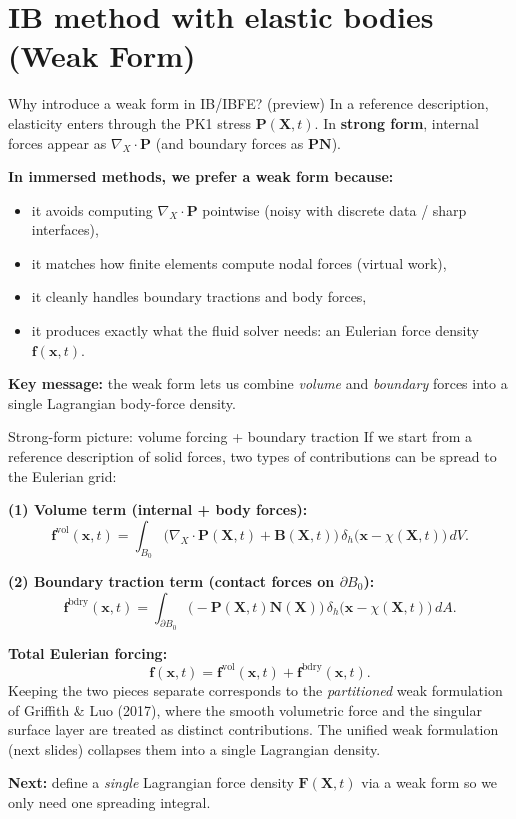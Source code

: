 \documentclass[aspectratio=169]{beamer}
\newcommand{\x}{\bm{x}}
\newcommand{\X}{\bm{X}}
\newcommand{\divX}{\nabla_{\!X}\!\cdot}
\newcommand{\Pten}{\bm{P}}        %
\newcommand{\Nvec}{\bm{N}}       %
\newcommand{\FLag}{\bm{F}}       %
\newcommand{\fEuler}{\bm{f}}     %
\newcommand{\deltah}{\delta_h}   %
\begin{document}
\section{IB method with elastic bodies (Weak Form)}
\begin{frame}{Why introduce a weak form in IB/IBFE? (preview)}
\small
In a reference description, elasticity enters through the PK1 stress \(\Pten(\X,t)\).
In \textbf{strong form}, internal forces appear as \(\divX \Pten\) (and boundary forces as \(\Pten\Nvec\)).

\medskip
\textbf{In immersed methods, we prefer a weak form because:}
\begin{itemize}
\item it avoids computing \(\divX\Pten\) pointwise (noisy with discrete data / sharp interfaces),
\item it matches how finite elements compute nodal forces (virtual work),
\item it cleanly handles boundary tractions and body forces,
\item it produces exactly what the fluid solver needs: an Eulerian force density \(\fEuler(\x,t)\).
\end{itemize}

\medskip
\textbf{Key message:} the weak form lets us combine \emph{volume} and \emph{boundary} forces into a single Lagrangian body-force density.
\end{frame}

\begin{frame}{Strong-form picture: volume forcing + boundary traction}
\small
If we start from a reference description of solid forces, two types of contributions can be spread to the Eulerian grid:

\medskip
\textbf{(1) Volume term (internal + body forces):}
\[
\fEuler^{\text{vol}}(\x,t)
=
\int_{B_0}\big(\divX\Pten(\X,t) + \bm{B}(\X,t)\big)\,
\deltah\!\big(\x-\chi(\X,t)\big)\,dV.
\]

\medskip
\textbf{(2) Boundary traction term (contact forces on \(\partial B_0\)):}
\[
\fEuler^{\text{bdry}}(\x,t)
=
\int_{\partial B_0}\big(-\Pten(\X,t)\Nvec(\X)\big)\,
\deltah\!\big(\x-\chi(\X,t)\big)\,dA.
\]

\medskip
\textbf{Total Eulerian forcing:}\quad
\[
\fEuler(\x,t)=\fEuler^{\text{vol}}(\x,t)+\fEuler^{\text{bdry}}(\x,t).
\]
\scriptsize Keeping the two pieces separate corresponds to the \emph{partitioned} weak formulation of Griffith \& Luo (2017), where the smooth volumetric force and the singular surface layer are treated as distinct contributions. The unified weak formulation (next slides) collapses them into a single Lagrangian density.

\medskip
\small
\textbf{Next:} define a \emph{single} Lagrangian force density \(\FLag(\X,t)\) via a weak form so we only need one spreading integral.
\end{frame}
\end{document}
